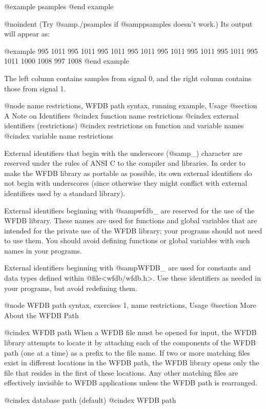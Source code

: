 {@example
psamples
@end example

@noindent
(Try @samp{./psamples} if @samp{psamples} doesn't work.)  Its output
will appear as:

@example
995     1011
995     1011
995     1011
995     1011
995     1011
995     1011
995     1011
995     1011
1000    1008
997     1008
@end example

The left column contains samples from signal 0, and the right column
contains those from signal 1.

@node     name restrictions, WFDB path syntax, running example, Usage
@section A Note on Identifiers
@cindex function name restrictions
@cindex external identifiers (restrictions)
@cindex restrictions on function and variable names
@cindex variable name restrictions

External identifiers that begin with the underscore (@samp{_}) character
are reserved under the rules of ANSI C to the compiler and libraries.
In order to make the WFDB library as portable as possible, its own external
identifiers do not begin with underscores (since otherwise they might
conflict with external identifiers used by a standard library).

External identifiers beginning with @samp{wfdb_} are reserved for the use
of the WFDB library.  These names are used for functions and global variables
that are intended for the private use of the WFDB library; your programs
should not need to use them.  You should avoid defining functions or
global variables with such names in your programs.

External identifiers beginning with @samp{WFDB_} are used for constants
and data types defined within @file{<wfdb/wfdb.h>}.  Use these identifiers
as needed in your programs, but avoid redefining them.

@node     WFDB path syntax, exercises 1, name restrictions, Usage
@section More About the WFDB Path

@cindex WFDB path
When a WFDB file must be opened for input, the WFDB library attempts to
locate it by attaching each of the components of the WFDB path (one at a
time) as a prefix to the file name.  If two or more matching files exist
in different locations in the WFDB path, the WFDB library opens only the
file that resides in the first of these locations.  Any other matching
files are effectively invisible to WFDB applications unless the WFDB
path is rearranged.

@cindex database path (default)
@cindex WFDB path

}
